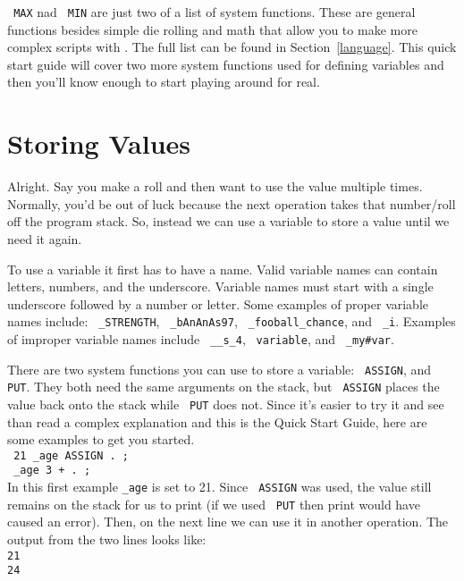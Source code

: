 \texttt{ MAX} nad \texttt{ MIN} are just two of a list of system functions. These are
general functions besides simple die rolling and math that allow you to make
more complex scripts with \progLogo. The full list can be found in 
Section~\ref{language}. This quick start guide will cover two more system
functions used for defining variables and then you'll know enough to start
playing around for real.

\section{Storing Values}
\label{firstVariables}
Alright. Say you make a roll and then want to use the value multiple times.
Normally, you'd be out of luck because the next operation takes that number/roll
off the program stack. So, instead we can use a variable to store a value
until we need it again.

To use a variable it first has to have a name. Valid variable names can contain
letters, numbers, and the underscore. Variable names must start with a single
underscore followed by a number or letter. Some examples of proper variable
names include: \texttt{ \_STRENGTH}, \texttt{ \_bAnAnAs97},
\texttt{ \_fooball\_chance}, and \texttt{ \_i}. Examples of improper variable names
include \texttt{ \_\_s\_4}, \texttt{ variable}, and \texttt{ \_my\#var}. 

There are two system functions you can use to store a variable:
\texttt{ ASSIGN}, and \texttt{ PUT}. They both need the same arguments on the
stack, but \texttt{ ASSIGN} places the value back onto the stack while \texttt{ PUT}
does not. Since it's easier to try it and see than read a complex explanation
and this is the Quick Start Guide, here are some examples to get you started.\\
\indent \texttt{ 21 \_age ASSIGN . ;}\\
\indent \texttt{ \_age 3 + . ;}\\
In this first example \texttt{\_age} is set to 21. Since \texttt{ ASSIGN} was used, the
value still remains on the stack for us to print (if we used
\texttt{ PUT} then print would have caused an error). Then, on the next line we can
use it in another operation. The output from the two lines looks like:\\
\texttt{21\\24}





